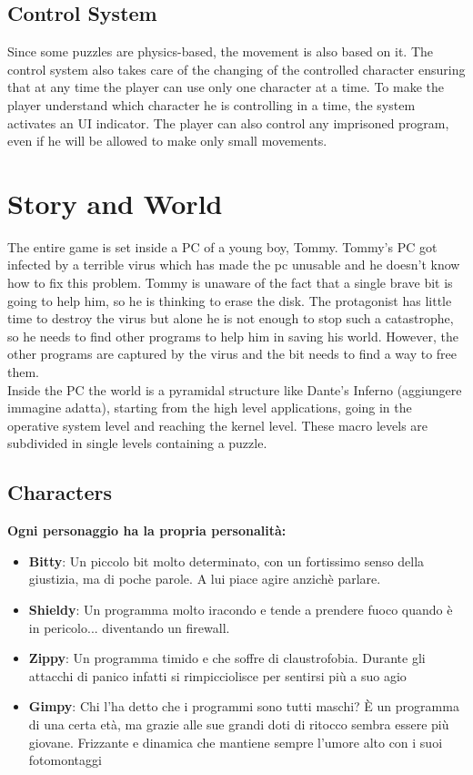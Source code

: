 \documentclass[12pt, a4paper]{report}
\begin{document}
\section*{Control System}
Since some puzzles are physics-based, the movement is also based on it. The control system also takes care of the changing of the controlled character ensuring that at any time the player can use only one character at a time. To make the player understand which character he is controlling in a time, the system activates an UI indicator. The player can also control any imprisoned program, even if he will be allowed to make only small movements.



\chapter{Story and World}
The entire game is set inside a PC of a young boy, Tommy. Tommy’s PC got infected by a terrible virus which has made the pc unusable and he doesn’t know how to fix this problem. Tommy is unaware of the fact that a single brave bit is going to help him, so he is thinking to erase the disk. The protagonist has little time to destroy the virus but alone he is not enough to stop such a catastrophe, so he needs to find other programs to help him in saving his world. However, the other programs are captured by the virus and the bit needs to find a way to free them.\\
Inside the PC the world is a pyramidal structure like Dante’s Inferno (aggiungere immagine adatta), starting from the high level applications, going in the operative system level and reaching the kernel level. These macro levels are subdivided in single levels containing a puzzle.

\section*{Characters}
\textbf{Ogni personaggio ha la propria personalità:}
\begin{itemize}
\item \textbf{Bitty}: Un piccolo bit molto determinato, con un fortissimo senso della giustizia, ma di poche parole. A lui piace agire anzichè parlare.
\item \textbf{Shieldy}: Un programma molto iracondo e tende a prendere fuoco quando è in pericolo... diventando un firewall.
\item \textbf{Zippy}: Un programma timido e che soffre di claustrofobia. Durante gli attacchi di panico infatti si rimpicciolisce per sentirsi più a suo agio
\item \textbf{Gimpy}: Chi l'ha detto che i programmi sono tutti maschi? È un programma di una certa età, ma grazie alle sue grandi doti di ritocco sembra essere più giovane. Frizzante e dinamica che mantiene sempre l'umore alto con i suoi fotomontaggi
\end{itemize}
\end{document}
